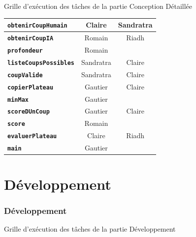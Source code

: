 \documentclass{beamer}
\begin{document}
\begin{frame}[label=cd]
\begin{alertblock}{Grille d’exécution des tâches de la partie Conception Détaillée}
{\begin{table}[h]
\begin{center}
\begin{tabular}{c|c|c|}
  \multicolumn{1}{|l|}{\textbf{\texttt{obtenirCoupHumain}}} & Claire & Sandratra\\ \hline
 \multicolumn{1}{|l|}{ \textbf{\texttt{obtenirCoupIA}}} & Romain & Riadh \\ \hline
  \multicolumn{1}{|l|}{\textbf{\texttt{profondeur}}} & Romain & \cellcolor{lightgray} \\ \hline
  \multicolumn{1}{|l|}{\textbf{\texttt{listeCoupsPossibles}}} & Sandratra & Claire \\ \hline
 \multicolumn{1}{|l|}{ \textbf{\texttt{coupValide}}} & Sandratra & Claire\\ \hline
  \multicolumn{1}{|l|}{\textbf{\texttt{copierPlateau}}} & Gautier & Claire \\ \hline
  \multicolumn{1}{|l|}{\textbf{\texttt{minMax}}} & Gautier & \cellcolor{lightgray} \\ \hline
  \multicolumn{1}{|l|}{\textbf{\texttt{scoreDUnCoup}}} & Gautier & Claire \\ \hline
  \multicolumn{1}{|l|}{\textbf{\texttt{score}}} & Romain &   \cellcolor{lightgray}  \\ \hline
 \multicolumn{1}{|l|}{ \textbf{\texttt{evaluerPlateau}}} & Claire &  Riadh \\ \hline
 \multicolumn{1}{|l|}{ \textbf{\texttt{main}}} & Gautier & \cellcolor{lightgray} \\ \hline
\end{tabular}
\end{center}
\end{table}}

	\end{alertblock}
	\end{frame}
	
		\section{Développement}
	\begin{frame}[label=dev] %
	\frametitle{Développement}
	\begin{alertblock}{Grille d’exécution des tâches de la partie Développement}
   	\rightskip=0pt\leftskip=0pt
   	{\tiny


	}
	\end{alertblock}
	\end{frame}
\end{document}
